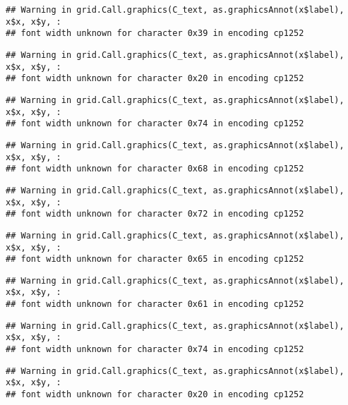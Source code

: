 \documentclass[
]{article}
\begin{document}
\begin{verbatim}
## Warning in grid.Call.graphics(C_text, as.graphicsAnnot(x$label), x$x, x$y, :
## font width unknown for character 0x39 in encoding cp1252
\end{verbatim}

\begin{verbatim}
## Warning in grid.Call.graphics(C_text, as.graphicsAnnot(x$label), x$x, x$y, :
## font width unknown for character 0x20 in encoding cp1252
\end{verbatim}

\begin{verbatim}
## Warning in grid.Call.graphics(C_text, as.graphicsAnnot(x$label), x$x, x$y, :
## font width unknown for character 0x74 in encoding cp1252
\end{verbatim}

\begin{verbatim}
## Warning in grid.Call.graphics(C_text, as.graphicsAnnot(x$label), x$x, x$y, :
## font width unknown for character 0x68 in encoding cp1252
\end{verbatim}

\begin{verbatim}
## Warning in grid.Call.graphics(C_text, as.graphicsAnnot(x$label), x$x, x$y, :
## font width unknown for character 0x72 in encoding cp1252
\end{verbatim}

\begin{verbatim}
## Warning in grid.Call.graphics(C_text, as.graphicsAnnot(x$label), x$x, x$y, :
## font width unknown for character 0x65 in encoding cp1252
\end{verbatim}

\begin{verbatim}
## Warning in grid.Call.graphics(C_text, as.graphicsAnnot(x$label), x$x, x$y, :
## font width unknown for character 0x61 in encoding cp1252
\end{verbatim}

\begin{verbatim}
## Warning in grid.Call.graphics(C_text, as.graphicsAnnot(x$label), x$x, x$y, :
## font width unknown for character 0x74 in encoding cp1252
\end{verbatim}

\begin{verbatim}
## Warning in grid.Call.graphics(C_text, as.graphicsAnnot(x$label), x$x, x$y, :
## font width unknown for character 0x20 in encoding cp1252
\end{verbatim}
\end{document}
